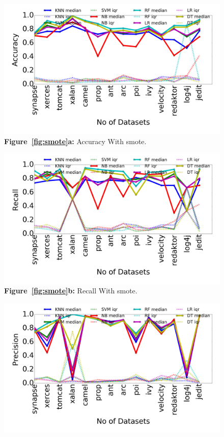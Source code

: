 \documentclass[conference]{IEEEtran}
\begin{document}
\begin{figure}[!htbp]
    \centering
    \begin{minipage}[b]{0.49\linewidth}
        \begin{center}
        \includegraphics[width=\linewidth]{Accuracy_smote.png}
  {\bf Figure~\ref{fig:smote}a:} Accuracy With smote.
  \end{center}
    \end{minipage}%
    \begin{minipage}[b]{0.49\linewidth}
        \begin{center}
        \includegraphics[width=\linewidth]{Recall_smote.png}
  {\bf Figure~\ref{fig:smote}b:} Recall With smote.
  \end{center}
    \end{minipage}
    \begin{minipage}[b]{0.49\linewidth}
        \begin{center}
        \includegraphics[width=\linewidth]{Precision_smote.png}

\end{center}
\end{minipage}
\end{figure}
\end{document}
